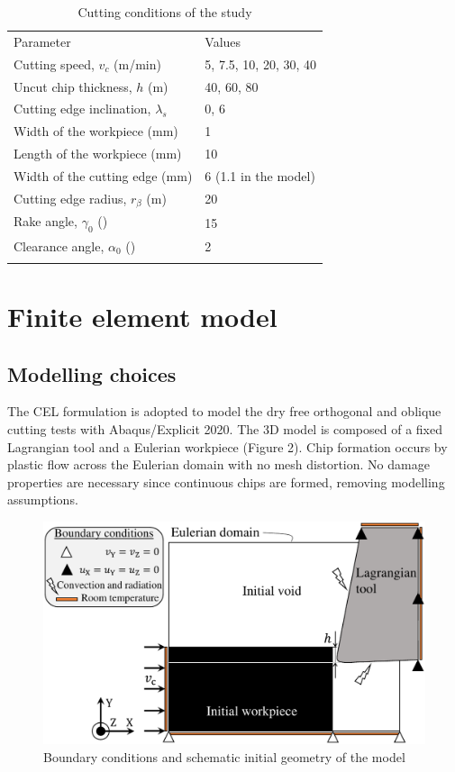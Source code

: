 \documentclass[final,5p,times,twocolumn]{elsarticle}
\begin{document}
%
\begin{table}[!h]
\begin{center}
\caption{\label{tab:CutCond} Cutting conditions of the study}
\begin{tabular}{ll}
\hline\noalign{\smallskip}
Parameter  & Values\\
\noalign{\smallskip}\hline\noalign{\smallskip}
Cutting speed, $v_c$ (m/min) & 5, 7.5, 10, 20, 30, 40\\
Uncut chip thickness, $h$ (\textmu{}m) & 40, 60, 80\\
Cutting edge inclination, $\lambda_s$ & 0, 6\\
Width of the workpiece (mm) & 1\\
Length of the workpiece (mm) & 10\\
Width of the cutting edge (mm) & 6 (1.1 in the model)\\
Cutting edge radius, $r_\beta$ (\textmu{}m) & 20\\
Rake angle, $\gamma_0$ (\textdegree{}) & 15\\
Clearance angle, $\alpha_0$ (\textdegree{}) & 2\\
\noalign{\smallskip}\hline
\end{tabular}
\end{center}
\end{table}
%

\section{Finite element model}
\label{FEM}

\subsection{Modelling choices}

The CEL formulation is adopted to model the dry free orthogonal and oblique cutting tests with Abaqus/Explicit 2020. The 3D model is composed of a fixed Lagrangian tool and a Eulerian workpiece (Figure 2). Chip formation occurs by plastic flow across the Eulerian domain with no mesh distortion. No damage properties are necessary since continuous chips are formed, removing modelling assumptions.

\begin{figure}[h]
\centering
\includegraphics{Figures/BC}
\caption{Boundary conditions and schematic initial geometry of the model}
\label{BC}
\end{figure}
\end{document}

